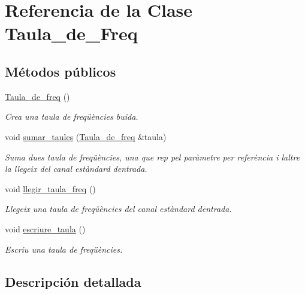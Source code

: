\hypertarget{class_taula__de___freq}{}\section{Referencia de la Clase Taula\+\_\+de\+\_\+\+Freq}
\label{class_taula__de___freq}
\subsection*{Métodos públicos}
\begin{DoxyCompactItemize}
\item 
\hyperlink{class_taula__de___freq_a4d595845d73112d4b9f6597f418c5267}{Taula\+\_\+de\+\_\+freq} ()
\begin{DoxyCompactList}\small\item\em Crea una taula de freqüències buida. \end{DoxyCompactList}\item 
void \hyperlink{class_taula__de___freq_ace5e740c1cee29557fd7ad80618ccb8a}{sumar\+\_\+taules} (\hyperlink{class_taula__de__freq}{Taula\+\_\+de\+\_\+freq} \&taula)
\begin{DoxyCompactList}\small\item\em Suma dues taula de freqüències, una que rep pel paràmetre per referència i l\textquotesingle{}altre la llegeix del canal estàndard d\textquotesingle{}entrada. \end{DoxyCompactList}\item 
void \hyperlink{class_taula__de___freq_ac7e0b22823475bacb7a8556ae1d92041}{llegir\+\_\+taula\+\_\+freq} ()
\begin{DoxyCompactList}\small\item\em Llegeix una taula de freqüències del canal estàndard d\textquotesingle{}entrada. \end{DoxyCompactList}\item 
void \hyperlink{class_taula__de___freq_a2455dc33e7299c2c68ab06f967df8e60}{escriure\+\_\+taula} ()
\begin{DoxyCompactList}\small\item\em Escriu una taula de freqüències. \end{DoxyCompactList}\end{DoxyCompactItemize}


\subsection{Descripción detallada}


